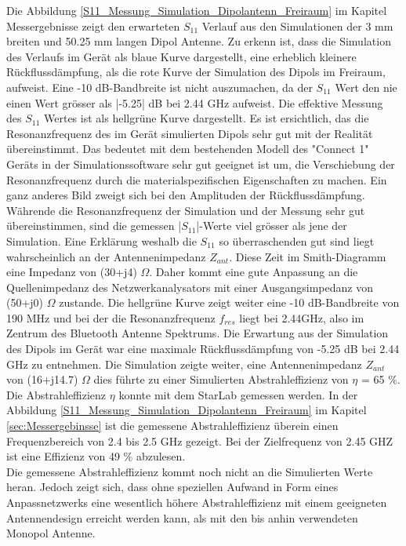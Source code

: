 Die Abbildung \ref{S11_Messung_Simulation_Dipolantenn_Freiraum} im Kapitel Messergebnisse zeigt den erwarteten $S_{11}$ Verlauf aus den Simulationen der 3 mm breiten und 50.25 mm langen Dipol Antenne.  Zu erkenn ist, dass die Simulation des Verlaufs im Gerät als blaue Kurve dargestellt, eine erheblich kleinere Rückflussdämpfung, als die rote Kurve der Simulation des Dipols im Freiraum, aufweist. Eine -10 dB-Bandbreite ist nicht auszumachen, da der $S_{11}$ Wert den nie einen Wert grösser als |-5.25| dB bei 2.44 GHz aufweist. Die effektive Messung des $S_{11}$ Wertes ist als hellgrüne Kurve dargestellt. Es ist ersichtlich, das die Resonanzfrequenz des im Gerät simulierten Dipols sehr gut mit der Realität übereinstimmt. Das bedeutet mit dem bestehenden Modell des "Connect 1" Geräts in der Simulationssoftware sehr gut geeignet ist um, die Verschiebung der Resonanzfrequenz durch die materialspezifischen Eigenschaften zu machen. Ein ganz anderes Bild zweigt sich bei den Amplituden der Rückflussdämpfung. Währende die Resonanzfrequenz der Simulation und der Messung sehr gut übereinstimmen, sind die gemessen |$S_{11}$|-Werte viel grösser als jene der Simulation. Eine Erklärung weshalb die $S_{11}$ so überraschenden gut sind liegt wahrscheinlich an der Antennenimpedanz $Z_{ant}$. Diese Zeit im Smith-Diagramm eine Impedanz von (30+j4) $\Omega$. Daher kommt eine gute Anpassung an die Quellenimpedanz des Netzwerkanalysators mit einer Ausgangsimpedanz von (50+j0) $\Omega$ zustande. Die hellgrüne Kurve zeigt weiter eine -10 dB-Bandbreite von 190 MHz und bei der die Resonanzfrequenz $f_{res}$ liegt bei 2.44GHz, also im Zentrum des Bluetooth Antenne Spektrums. Die Erwartung aus der Simulation des Dipols im Gerät war eine maximale Rückflussdämpfung von -5.25 dB bei 2.44 GHz zu entnehmen. Die Simulation zeigte weiter, eine Antennenimpedanz $Z_{ant}$ von (16+j14.7) $\Omega$ dies führte zu einer Simulierten Abstrahleffizienz von $\eta$ = 65 $\%$.\\
Die Abstrahleffizienz $\eta$ konnte mit dem StarLab gemessen werden. In der Abbildung \ref{S11_Messung_Simulation_Dipolantenn_Freiraum} im Kapitel \ref{sec:Messergebinsse}  ist die gemessene Abstrahleffizienz überein einen Frequenzbereich von 2.4 bis 2.5 GHz gezeigt. Bei der Zielfrequenz von 2.45 GHZ ist eine Effizienz von 49 $\%$ abzulesen.\\
Die gemessene Abstrahleffizienz kommt noch nicht an die Simulierten Werte heran. Jedoch zeigt sich, dass ohne speziellen Aufwand in Form eines Anpassnetzwerks eine wesentlich höhere Abstrahleffizienz mit einem geeigneten Antennendesign erreicht werden kann, als mit den bis anhin verwendeten Monopol Antenne.\\
